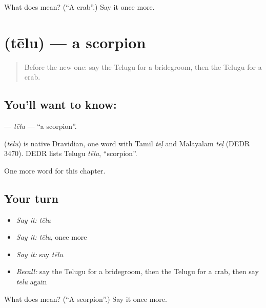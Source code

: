 \begin{tcolorbox}[breakable,colback=teal!4,colframe=teal!35!black,title={Before you move on}]
What does  mean? (\textquotedblleft{}A crab\textquotedblright{}.) Say it once more.
\end{tcolorbox}
\section[\texorpdfstring{\te{తేలు} (tēlu)}{తేలు (tēlu)}]{ (tēlu) — a scorpion}

\label{lesson:TE-C228-telu}



\begin{quote}
Before the new one: say the Telugu for a bridegroom, then the Telugu for a crab.
\end{quote}

\subsection*{You'll want to know: }
\textbf{} — \emph{tēlu} — \textquotedblleft{}a scorpion\textquotedblright{}.

\begin{cousinweb}
\textbf{} (\emph{tēlu}) is native Dravidian, one word with Tamil \emph{tēḷ} and Malayalam \emph{tēḷ} (DEDR 3470). DEDR lists Telugu \emph{tēlu}, \textquotedblleft{}scorpion\textquotedblright{}.
\end{cousinweb}

\begin{grammarlens}[title={What you've built}]
One more word for this chapter.
\end{grammarlens}

\subsection*{Your turn}
\begin{itemize}
\raggedright
  \item \emph{Say it:} \emph{tēlu}
  \item \emph{Say it:} \emph{tēlu}, once more
  \item \emph{Say it:} say \emph{tēlu}
  \item \emph{Recall:} say the Telugu for a bridegroom, then the Telugu for a crab, then say \emph{tēlu} again
\end{itemize}

\begin{tcolorbox}[breakable,colback=teal!4,colframe=teal!35!black,title={Before you move on}]
What does  mean? (\textquotedblleft{}A scorpion\textquotedblright{}.) Say it once more.
\end{tcolorbox}
